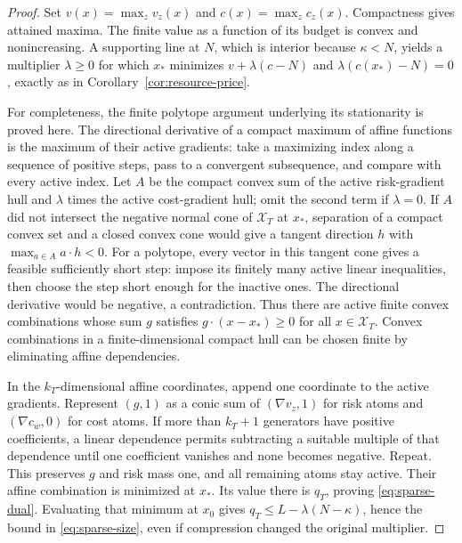 \begin{proof}
Set $v(x)=\max_zv_z(x)$ and $c(x)=\max_zc_z(x)$. Compactness gives attained maxima. The finite value as a function of its budget is convex and nonincreasing. A supporting line at $N$, which is interior because $\kappa<N$, yields a multiplier $\lambda\ge0$ for which $x_*$ minimizes $v+\lambda(c-N)$ and $\lambda(c(x_*)-N)=0$, exactly as in Corollary~\ref{cor:resource-price}.

For completeness, the finite polytope argument underlying its stationarity is proved here. The directional derivative of a compact maximum of affine functions is the maximum of their active gradients: take a maximizing index along a sequence of positive steps, pass to a convergent subsequence, and compare with every active index. Let $A$ be the compact convex sum of the active risk-gradient hull and $\lambda$ times the active cost-gradient hull; omit the second term if $\lambda=0$. If $A$ did not intersect the negative normal cone of $\mathcal X_T$ at $x_*$, separation of a compact convex set and a closed convex cone would give a tangent direction $h$ with $\max_{a\in A}a\cdot h<0$. For a polytope, every vector in this tangent cone gives a feasible sufficiently short step: impose its finitely many active linear inequalities, then choose the step short enough for the inactive ones. The directional derivative would be negative, a contradiction. Thus there are active finite convex combinations whose sum $g$ satisfies $g\cdot(x-x_*)\ge0$ for all $x\in\mathcal X_T$. Convex combinations in a finite-dimensional compact hull can be chosen finite by eliminating affine dependencies.

In the $k_T$-dimensional affine coordinates, append one coordinate to the active gradients. Represent $(g,1)$ as a conic sum of $(\nabla v_z,1)$ for risk atoms and $(\nabla c_w,0)$ for cost atoms. If more than $k_T+1$ generators have positive coefficients, a linear dependence permits subtracting a suitable multiple of that dependence until one coefficient vanishes and none becomes negative. Repeat. This preserves $g$ and risk mass one, and all remaining atoms stay active. Their affine combination is minimized at $x_*$. Its value there is $q_T$, proving \eqref{eq:sparse-dual}. Evaluating that minimum at $x_0$ gives $q_T\le L-\lambda(N-\kappa)$, hence the bound in \eqref{eq:sparse-size}, even if compression changed the original multiplier.


\end{proof}
